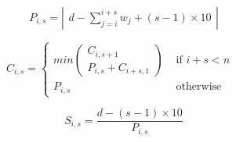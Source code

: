 \documentclass[fleqn]{article}
\begin{document}
  
\begin{equation}
  P_{i,s} = \left | \begin{array}{ll} 
    d - \sum\limits_{j=i}^{i+s} w_j + (s-1) \times 10
  \end{array} \right |
\end{equation}

  
\begin{equation}
  C_{i,s} = \left \{ \begin{array}{ll}
    min \left ( \begin{array}{ll}
      C_{i,s+1} \\
      P_{i,s} + C_{i+s, 1}
    \end{array} \right ) &\mbox { if $i+s < n$ }\\
    P_{i,s} &\mbox { otherwise }
  \end{array} \right.
\end{equation}

\begin{equation}
  S_{i,s} = \frac{d - (s-1) \times 10}{P_{i,s}}
\end{equation}
\end{document}
